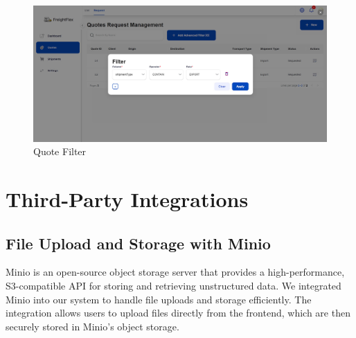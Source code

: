 \begin{figure}[H]
    \centering
    \includegraphics[width=15cm]{graphics/UI/quote-filter.png}
    \caption{Quote Filter}
    \label{fig:new-quotes}
\end{figure}

\section{Third-Party Integrations}
\subsection{File Upload and Storage with Minio}
Minio \cite{minio} is an open-source object storage server that provides a high-performance, S3-compatible API for storing and retrieving unstructured data. We integrated Minio into our system to handle file uploads and storage efficiently. The integration allows users to upload files directly from the frontend, which are then securely stored in Minio's object storage.

